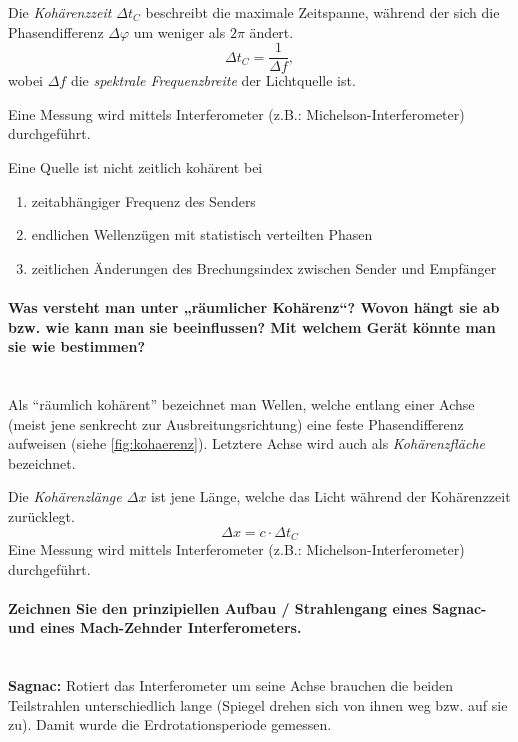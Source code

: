 \documentclass[a4paper, 11pt, ngerman, parskip=half-]{scrartcl}
\newcommand{\myparagraph}[1]{\paragraph{#1}\mbox{}\\}
\begin{document}
Die \textit{Kohärenzzeit $\Delta t_C$} beschreibt die maximale Zeitspanne, während der sich die Phasendifferenz $\Delta \varphi$ um weniger als $2\pi$ ändert.
%
\[\Delta t_C = \frac{1}{\Delta f},\]
%
wobei $\Delta f$ die \textit{spektrale Frequenzbreite} der Lichtquelle ist.

Eine Messung wird mittels Interferometer (z.B.: Michelson-Interferometer) durchgeführt.

Eine Quelle ist nicht zeitlich kohärent bei
\begin{enumerate}
    \item zeitabhängiger Frequenz des Senders
    \item endlichen Wellenzügen mit statistisch verteilten Phasen
    \item zeitlichen Änderungen des Brechungsindex zwischen Sender und Empfänger
\end{enumerate}
\myparagraph{Was versteht man unter „räumlicher Kohärenz“? Wovon hängt sie ab bzw. wie kann man sie
    beeinflussen? Mit welchem Gerät könnte man sie wie bestimmen?}

Als \enquote{räumlich kohärent} bezeichnet man Wellen, welche entlang einer Achse (meist jene senkrecht zur Ausbreitungsrichtung)
eine feste Phasendifferenz aufweisen (siehe \autoref{fig:kohaerenz}). Letztere Achse wird auch als \textit{Kohärenzfläche} bezeichnet.

Die \textit{Kohärenzlänge $\Delta x$} ist jene Länge, welche das Licht während der Kohärenzzeit zurücklegt.
%
\[\Delta x = c \cdot \Delta t_C\]
%
Eine Messung wird mittels Interferometer (z.B.: Michelson-Interferometer) durchgeführt.
%
\myparagraph{Zeichnen Sie den prinzipiellen Aufbau / Strahlengang eines Sagnac- und eines Mach-Zehnder Interferometers.}

\textbf{Sagnac:} Rotiert das Interferometer um seine Achse brauchen die beiden Teilstrahlen unterschiedlich lange
(Spiegel drehen sich von ihnen weg bzw. auf sie zu).
Damit wurde die Erdrotationsperiode gemessen.
\end{document}
